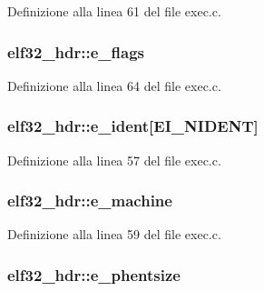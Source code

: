 Definizione alla linea 61 del file exec.\+c.

\hypertarget{structelf32__hdr_a8695845266a8825d6cc9c04205c783f5}{
\subsubsection[{e\+\_\+flags}]{ elf32\+\_\+hdr\+::e\+\_\+flags}}\label{structelf32__hdr_a8695845266a8825d6cc9c04205c783f5}


Definizione alla linea 64 del file exec.\+c.

\hypertarget{structelf32__hdr_a47cad02c87b35eab4d8fda5f3f0fefd4}{
\subsubsection[{e\+\_\+ident}]{ elf32\+\_\+hdr\+::e\+\_\+ident\mbox{[}{\bf E\+I\+\_\+\+N\+I\+D\+E\+N\+T}\mbox{]}}}\label{structelf32__hdr_a47cad02c87b35eab4d8fda5f3f0fefd4}


Definizione alla linea 57 del file exec.\+c.

\hypertarget{structelf32__hdr_ac683164e0380f6babe3f46a3a1ffdfe9}{
\subsubsection[{e\+\_\+machine}]{ elf32\+\_\+hdr\+::e\+\_\+machine}}\label{structelf32__hdr_ac683164e0380f6babe3f46a3a1ffdfe9}


Definizione alla linea 59 del file exec.\+c.

\hypertarget{structelf32__hdr_a7c8f7ea4bb2789905be6dc875c1e502d}{
\subsubsection[{e\+\_\+phentsize}]{ elf32\+\_\+hdr\+::e\+\_\+phentsize}}\label{structelf32__hdr_a7c8f7ea4bb2789905be6dc875c1e502d}


